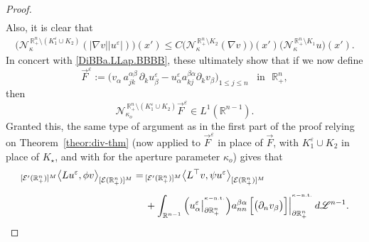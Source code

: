 \documentclass[11pt,reqno]{amsart}
\numberwithin{equation}{section}
\theoremstyle{remark}
\begin{document}
\begin{proof}
\begin{align}
\end{align}
%
Also, it is clear that 
%
\begin{align}\label{Cr654.A-HM.2-b22.bb}
\big({\mathcal{N}}^{\,\mathbb{R}^{n}_{+}\setminus (K_1^\varepsilon\cup K_2)}_{\kappa}(|\nabla v||u^\varepsilon|)\big)(x')
\leq C\big({\mathcal{N}}^{\,\mathbb{R}^{n}_{+}\setminus K_2}_{\kappa}(\nabla v)\big)(x')
\big({\mathcal{N}}^{\,\mathbb{R}^{n}_{+}\setminus K_1}_{\kappa}u\big)(x').
\end{align}
%
In concert with \eqref{DiBBa.LLap.BBBB}, these ultimately show that if we now define 
%
\begin{equation}\label{Yab-HBBaR46-bis}
\vec{F}^\varepsilon:=\Big(v_{\alpha}\,a^{\alpha\beta}_{jk}\,\partial_k u^\varepsilon_\beta
-u^\varepsilon_\alpha a^{\beta\alpha}_{kj}\partial_k v_{\beta}\Big)_{1\le j\le n}
\,\,\,\text{ in }\,\,{\mathbb{R}}^n_{+},
\end{equation}
%
then 
%
\begin{equation}\label{Yab-HBna-TAn.2-bis}
{\mathcal{N}}^{\,\mathbb{R}^{n}_{+}\setminus(K_1^\varepsilon\cup K_2)}_{\kappa_o}\vec{F}^\varepsilon\in L^1({\mathbb{R}}^{n-1}).
\end{equation}
%
Granted this, the same type of argument as in the first part of the proof 
relying on Theorem~\ref{theor:div-thm} (now applied to $\vec{F}^\varepsilon$ in place of $\vec{F}$, with 
$K_1^\varepsilon\cup K_2$ in place of $K_\star$, and with for the aperture parameter $\kappa_o$) gives that
%
\begin{align}\label{Ua-eDPa4.LAC}
{}_{[{\mathcal{E}}'(\mathbb{R}^{n}_{+})]^M}\big\langle Lu^\varepsilon,\phi v
\big\rangle_{[{\mathcal{E}}(\mathbb{R}^{n}_{+})]^M}
=&\,{}_{[{\mathcal{E}}'(\mathbb{R}^{n}_{+})]^M}\big\langle L^{\top}v,
\psi u^\varepsilon\big\rangle_{[{\mathcal{E}}(\mathbb{R}^{n}_{+})]^M}
\nonumber\\[4pt]
&\,+\int_{\mathbb{R}^{n-1}}
\Big(u^\varepsilon_\alpha\big|_{\partial\mathbb{R}^{n}_{+}}^{{}^{\kappa-{\rm n.t.}}}\Big) 
a^{\beta\alpha}_{nn}\,\Big[\big(\partial_n v_\beta\big)\Big]
\Big|_{\partial\mathbb{R}^{n}_{+}}^{{}^{\kappa-{\rm n.t.}}}\,d{\mathscr{L}}^{n-1}.
\end{align}


\end{proof}
\end{document}
